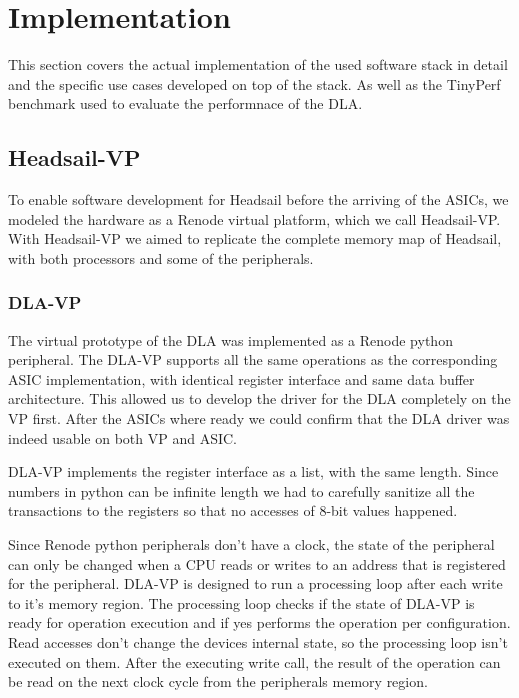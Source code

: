 \documentclass[12pt,a4paper,english
]{tunithesis}
\begin{document}
\chapter{Implementation}
\label{ch:implementation}
This section covers the actual implementation of the used software stack in detail and the specific use cases developed on top of the stack. As well as the TinyPerf benchmark used to evaluate the performnace of the DLA.

\section{Headsail-VP}
To enable software development for Headsail before the arriving of the ASICs, we modeled the hardware as a Renode virtual platform, which we call Headsail-VP. With Headsail-VP we aimed to replicate the complete memory map of Headsail, with both processors and some of the peripherals.

\subsection{DLA-VP}
The virtual prototype of the DLA was implemented as a Renode python peripheral. The DLA-VP supports all the same operations as the corresponding ASIC implementation, with identical register interface and same data buffer architecture. This allowed us to develop the driver for the DLA completely on the VP first. After the ASICs where ready we could confirm that the DLA driver was indeed usable on both VP and ASIC.

DLA-VP implements the register interface as a list, with the same length. Since numbers in python can be infinite length we had to carefully sanitize all the transactions to the registers so that no accesses of 8-bit values happened.

Since Renode python peripherals don't have a clock, the state of the peripheral can only be changed when a CPU reads or writes to an address that is registered for the peripheral. DLA-VP is designed to run a processing loop after each write to it's memory region. The processing loop checks if the state of DLA-VP is ready for operation execution and if yes performs the operation per configuration. Read accesses don't change the devices internal state, so the processing loop isn't executed on them. After the executing write call, the result of the operation can be read on the next clock cycle from the peripherals memory region.
\end{document}
